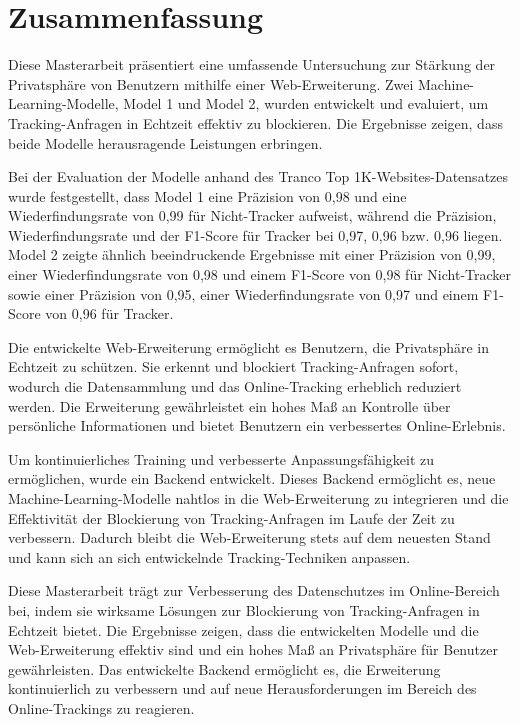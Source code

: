 \chapter*{Zusammenfassung}
\label{cha:zusammenfassung}

Diese Masterarbeit präsentiert eine umfassende Untersuchung zur Stärkung der Privatsphäre von Benutzern mithilfe einer Web-Erweiterung.
Zwei Machine-Learning-Modelle, Model 1 und Model 2, wurden entwickelt und evaluiert, um Tracking-Anfragen in Echtzeit effektiv zu
blockieren. Die Ergebnisse zeigen, dass beide Modelle herausragende Leistungen erbringen.

Bei der Evaluation der Modelle anhand des Tranco Top 1K-Websites-Datensatzes wurde festgestellt, dass Model 1 eine Präzision
von 0,98 und eine Wiederfindungsrate von 0,99 für Nicht-Tracker aufweist, während die Präzision, Wiederfindungsrate und der F1-Score
für Tracker bei 0,97, 0,96 bzw. 0,96 liegen. Model 2 zeigte ähnlich beeindruckende Ergebnisse mit einer Präzision von 0,99, einer
Wiederfindungsrate von 0,98 und einem F1-Score von 0,98 für Nicht-Tracker sowie einer Präzision von 0,95, einer Wiederfindungsrate
von 0,97 und einem F1-Score von 0,96 für Tracker.

Die entwickelte Web-Erweiterung ermöglicht es Benutzern, die Privatsphäre in Echtzeit zu schützen. Sie erkennt und blockiert
Tracking-Anfragen sofort, wodurch die Datensammlung und das Online-Tracking erheblich reduziert werden. Die Erweiterung
gewährleistet ein hohes Maß an Kontrolle über persönliche Informationen und bietet Benutzern ein verbessertes Online-Erlebnis.

Um kontinuierliches Training und verbesserte Anpassungsfähigkeit zu ermöglichen, wurde ein Backend entwickelt. Dieses Backend
ermöglicht es, neue Machine-Learning-Modelle nahtlos in die Web-Erweiterung zu integrieren und die Effektivität der Blockierung
von Tracking-Anfragen im Laufe der Zeit zu verbessern. Dadurch bleibt die Web-Erweiterung stets auf dem neuesten Stand und kann
sich an sich entwickelnde Tracking-Techniken anpassen.

Diese Masterarbeit trägt zur Verbesserung des Datenschutzes im Online-Bereich bei, indem sie wirksame Lösungen zur Blockierung
von Tracking-Anfragen in Echtzeit bietet. Die Ergebnisse zeigen, dass die entwickelten Modelle und die Web-Erweiterung effektiv
sind und ein hohes Maß an Privatsphäre für Benutzer gewährleisten. Das entwickelte Backend ermöglicht es, die Erweiterung
kontinuierlich zu verbessern und auf neue Herausforderungen im Bereich des Online-Trackings zu reagieren.
